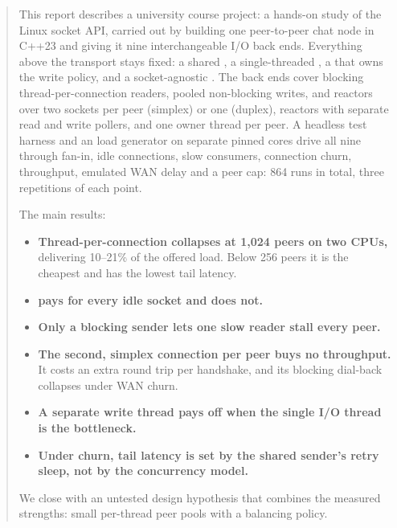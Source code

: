 \begin{abstract}
\noindent
This report describes a university course project: a hands-on study of the Linux
socket API, carried out by building one peer-to-peer chat node in C++23 and giving it
nine interchangeable I/O back ends. Everything above the transport stays fixed: a
shared , a single-threaded , a
 that owns the write policy, and a socket-agnostic
. The back ends cover blocking thread-per-connection readers,
pooled non-blocking writes,  and  reactors over two
sockets per peer (simplex) or one (duplex), reactors with separate read and write
pollers, and one owner thread per peer. A headless test harness and an 
load generator on separate pinned cores drive all nine through fan-in, idle
connections, slow consumers, connection churn, throughput, emulated WAN delay and a
peer cap: 864 runs in total, three repetitions of each point.

The main results:
\begin{itemize}
  \item \textbf{Thread-per-connection collapses at 1,024 peers on two CPUs,} delivering
        10--21\% of the offered load. Below 256 peers it is the cheapest and has the
        lowest tail latency.
  \item \textbf{ pays for every idle socket and  does not.}
  \item \textbf{Only a blocking sender lets one slow reader stall every peer.}
  \item \textbf{The second, simplex connection per peer buys no throughput.} It costs
        an extra round trip per handshake, and its blocking dial-back collapses under
        WAN churn.
  \item \textbf{A separate write thread pays off when the single I/O thread is the
        bottleneck.}
  \item \textbf{Under churn, tail latency is set by the shared sender's retry sleep,
        not by the concurrency model.}
\end{itemize}
We close with an untested design hypothesis that combines the measured strengths:
small per-thread peer pools with a balancing policy.
\end{abstract}
